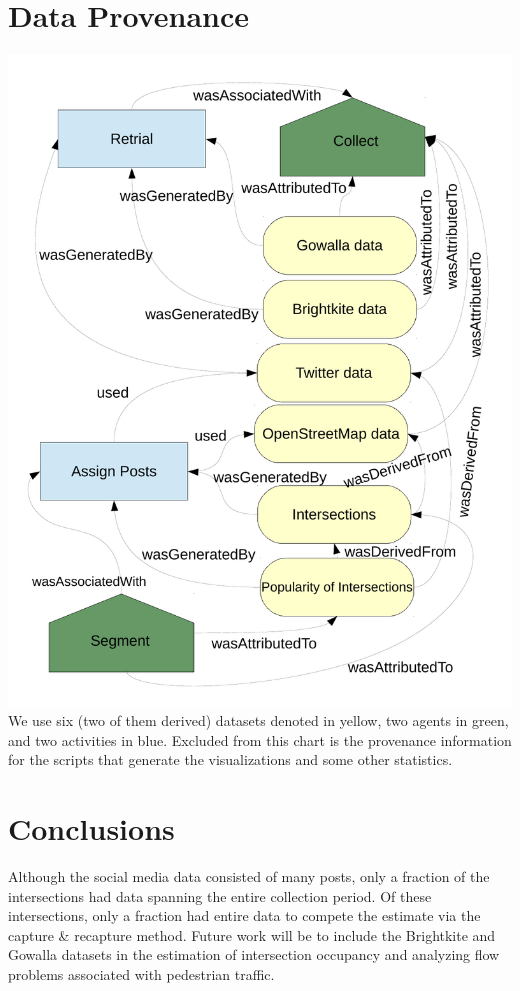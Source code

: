\documentclass{lposter}
\theoremstyle{plain}
\theoremstyle{definition}
\newcommand{\agent}[1]{{\color{ao(english)}#1}}
\newcommand{\activity}[1]{{\color{babyblue}#1}}
\newcommand{\dataset}[1]{{\color{yellow}#1}}
\begin{document}
\begin{poster}
\section{Data Provenance}
\includegraphics[scale=1]{prov.pdf}
We use six (two of them derived) \dataset{datasets} denoted in \dataset{yellow}, two \agent{agents} in \agent{green}, and two \activity{activities} in \activity{blue}. Excluded from this chart is the provenance information for the scripts that generate the visualizations and some other statistics. 

\section{Conclusions}
Although the social media data consisted of many posts, only a fraction of the intersections had data spanning the entire collection period. Of these intersections, only a fraction had entire data to compete the estimate via the capture \& recapture method. Future work will be to include the Brightkite and Gowalla datasets in the estimation of intersection occupancy and analyzing flow problems associated with pedestrian traffic.

\end{poster}
\end{document}

